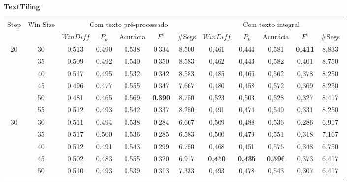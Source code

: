 \documentclass{article}
\begin{document}
 
\small

\pagestyle{empty}

\begin{table}[!h]
\center
\textbf{TextTiling} \\ 
	\begin{tabular}{|c|c||c|c|c|c|c||c|c|c|c|c|}
\hline 
\multirow{2}{*}{Step} & \multirow{2}{*}{Win Size}
  & \multicolumn{5}{c||}{Com texto pré-processado} & \multicolumn{5}{|c|}{Com texto integral}\\\cline{3-12} 
&& $WinDiff$ & $P_k$ & Acurácia & $F^1$ & \#Segs &  $WinDiff$ & $P_k$ & Acurácia & $F^1$ & \#Segs\\ \hline 
 \multirow{6}{*}{20} 
  & 30 & 0.513 & 0.490 & 0.538 & 0.334  & 8.500                 & 0,461 & 0,444 & 0,581 & \cellcolor{gray!20} \textbf{0,411} & 8,833  \\ \cline{2-12} 
  & 35 & 0.509 & 0.492 & 0.540 & 0.350  & 8.583                 & 0,462 & 0,443 & 0,582 & 0,401 & 8,750  \\  \cline{2-12}
  & 40 & 0.517 & 0.495 & 0.532 & 0.342  & 8.583                 & 0,485 & 0,466 & 0,562 & 0,378 & 8,250  \\  \cline{2-12}
  & 45 & 0.496 & 0.477 & 0.555 & 0.347  & 7.667                 & 0,480 & 0,458 & 0,572 & 0,369 & 8,250  \\  \cline{2-12}
  & 50 & 0.481 & 0.465 & 0.569 & \cellcolor{gray!20} \textbf{0.390} & 8.750  & 0,523 & 0,503 & 0,528 & 0,327 & 8,417  \\  \cline{2-12}
  & 55 & 0.512 & 0.493 & 0.542 & 0.337  & 8.250  & 0,491 & 0,474 & 0,549 & 0,331 & 8,250  \\ \hline      
 \multirow{6}{*}{30} 
  & 30 & 0.511 & 0.494 & 0.538 & 0.284  & 6.667                & 0,509 & 0,488 & 0,536 & 0,286 & 6,917  \\ \cline{2-12}    
  & 35 & 0.517 & 0.500 & 0.536 & 0.285  & 6.583                & 0,500 & 0,479 & 0,551 & 0,318 & 7,167  \\ \cline{2-12}         
  & 40 & 0.512 & 0.491 & 0.543 & 0.299  & 6.750                & 0,468 & 0,451 & 0,576 & 0,348 & 6,750  \\ \cline{2-12} 
  & 45 & 0.502 & 0.483 & 0.555 & 0.320  & 6.917                & \cellcolor{gray!20} \textbf{0,450} & \cellcolor{gray!20} \textbf{0,435} & \cellcolor{gray!20} \textbf{0,596} & 0,373 & 6,417  \\  \cline{2-12} 
  & 50 & 0.510 & 0.493 & 0.539 & 0.313  & 7.333                & 0,493 & 0,478 & 0,543 & 0,307 & 6,417  \\ \cline{2-12}                

\end{tabular}
\end{table}
\end{document}
